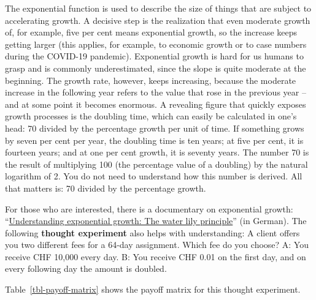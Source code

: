\documentclass[
  british,
  a4paper,
  DIV=11,
  numbers=noendperiod,
  oneside,
  openany]{scrreprt}
\begin{document}
\begin{tcolorbox}[enhanced jigsaw, arc=.35mm, bottomrule=.15mm, bottomtitle=1mm, breakable, colback=white, colbacktitle=quarto-callout-tip-color!10!white, colframe=quarto-callout-tip-color-frame, coltitle=black, left=2mm, leftrule=.75mm, opacityback=0, opacitybacktitle=0.6, rightrule=.15mm, title={Excursus: Exponential growth}, titlerule=0mm, toprule=.15mm, toptitle=1mm]

The exponential function is used to describe the size of things that are
subject to accelerating growth. A decisive step is the realization that
even moderate growth of, for example, five per cent means exponential
growth, so the increase keeps getting larger (this applies, for example,
to economic growth or to case numbers during the COVID-19 pandemic).
Exponential growth is hard for us humans to grasp and is commonly
underestimated, since the slope is quite moderate at the beginning. The
growth rate, however, keeps increasing, because the moderate increase in
the following year refers to the value that rose in the previous year --
and at some point it becomes enormous. A revealing figure that quickly
exposes growth processes is the doubling time, which can easily be
calculated in one's head: 70 divided by the percentage growth per unit
of time. If something grows by seven per cent per year, the doubling
time is ten years; at five per cent, it is fourteen years; and at one
per cent growth, it is seventy years. The number 70 is the result of
multiplying 100 (the percentage value of a doubling) by the natural
logarithm of 2. You do not need to understand how this number is
derived. All that matters is: 70 divided by the percentage growth.

For those who are interested, there is a documentary on exponential
growth:
``\href{https://www.3sat.de/wissen/wissenschaftsdoku/211216-sendung-wido-100.html}{Understanding
exponential growth: The water lily principle}'' (in German). The
following \textbf{thought experiment} also helps with understanding: A
client offers you two different fees for a 64-day assignment. Which fee
do you choose? A: You receive CHF 10,000 every day. B: You receive CHF
0.01 on the first day, and on every following day the amount is doubled.

Table~\ref{tbl-payoff-matrix} shows the payoff matrix for this thought
experiment.

\begingroup\fontsize{8}{10}\selectfont

\begin{longtable}[t]{lll}


\end{longtable}
\end{tcolorbox}
\end{document}
